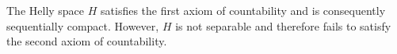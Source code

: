 The Helly space $H$ satisfies the first axiom of countability and is consequently sequentially compact. However, $H$ is not separable and therefore fails to satisfy the second axiom of countability.
